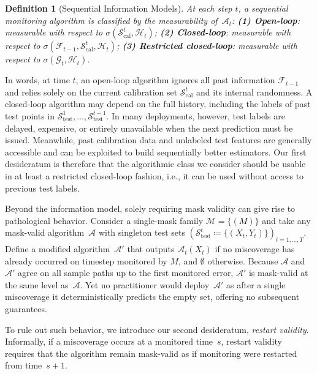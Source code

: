 \documentclass{uai2026} %
\newtheorem{definition}[theorem]{Definition}
\newcommand{\1}{\mathbf{1}}
\newcommand{\test}{\mathrm{test}}
\newcommand{\scal}{\mathcal{S}}
\newcommand{\F}{\mathcal{F}}
\newcommand{\G}{\mathcal{G}}
\newcommand{\mcal}{\mathcal{M}}
\newcommand{\cali}{\mathrm{cal}}
\newcommand{\scalcal}{\scal_{\cali}}
\newcommand{\scaltest}{\scal_{\test}}
\newcommand{\acal}{\mathcal{A}}
\begin{document}
\begin{definition}[Sequential Information Models]
  \label{def:info-models}
  At each step $t$, a sequential monitoring algorithm is classified by the measurability of~$\acal_t$:
  \textbf{(1) Open-loop}: measurable with respect to $\sigma(\scalcal^t, \mathcal{H}_t)$;
  \textbf{(2) Closed-loop}: measurable with respect to $\sigma(\F_{t-1}, \scalcal^t, \mathcal{H}_t)$;
  \textbf{(3) Restricted closed-loop}: measurable with respect to $\sigma(\G_t, \mathcal{H}_t)$.
\end{definition}

In words, at time $t$, an open-loop algorithm ignores all past information $\F_{t-1}$ and relies solely on the current calibration set $\scalcal^t$ and its internal randomness.
A closed-loop algorithm may depend on the full history, including the labels of past test points in $\scaltest^1, \ldots, \scaltest^{t-1}$.
In many deployments, however, test labels are delayed, expensive, or entirely unavailable when the next prediction must be issued. Meanwhile, past calibration data and unlabeled test features are generally accessible and can be exploited to build sequentially better estimators. Our first desideratum is therefore that the algorithmic class we consider should be usable in at least a restricted closed-loop fashion, i.e., it can be used without access to previous test labels.

Beyond the information model, solely requiring mask validity can give rise to pathological behavior.
Consider a single-mask family $\mcal = \{(M)\}$ and take any mask-valid algorithm~$\acal$ with singleton test sets $(\scaltest^t \coloneqq \{(X_t, Y_t)\})_{t=1,\ldots,T}$.
Define a modified algorithm~$\acal'$ that outputs $\acal_t(X_t)$ if no miscoverage has already occurred on timestep monitored by $M$, and $\emptyset$ otherwise.
Because $\acal$ and $\acal'$ agree on all sample paths up to the first monitored error, $\acal'$ is mask-valid at the same level as~$\acal$.
Yet no practitioner would deploy~$\acal'$ as after a single miscoverage it deterministically predicts the empty set, offering no subsequent guarantees.

To rule out such behavior, we introduce our second desideratum, \emph{restart validity}. Informally, if a miscoverage occurs at a monitored time~$s$, restart validity requires that the algorithm remain mask-valid as if monitoring were restarted from time~$s+1$.
\end{document}
